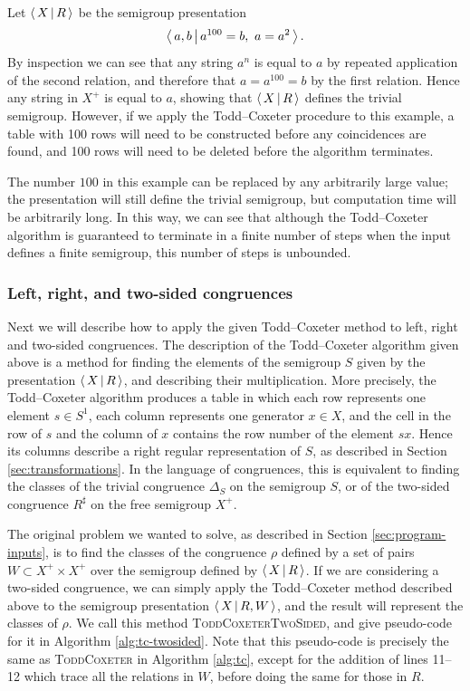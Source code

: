 \begin{example}
  \label{ex:tc-long}
  Let $\left\langle \, X \, \middle| \, R \, \right\rangle$ be the semigroup presentation
  $$\left\langle \, a,b \, \middle| \, a^{100}=b,\ a=a^2 \, \right\rangle.$$
  By inspection we can see that any string $a^n$ is equal to $a$ by repeated
  application of the second relation, and therefore that $a = a^{100} = b$ by
  the first relation.  Hence any string in $X^+$ is equal to $a$, showing that
  $\left\langle \, X \, \middle| \, R \, \right\rangle$ defines the trivial
  semigroup.  However, if we apply the Todd--Coxeter procedure to this example,
  a table with 100 rows will need to be constructed before any coincidences are
  found, and 100 rows will need to be deleted before the algorithm terminates.

  The number $100$ in this example can be replaced by
  any arbitrarily large value; the presentation will still define the
  trivial semigroup, but computation time will be arbitrarily long.
  In this way, we can see that although the Todd--Coxeter algorithm is guaranteed
  to terminate in a finite number of steps when the input defines a finite
  semigroup, this number of steps is unbounded.
\end{example}

\subsubsection{Left, right, and two-sided congruences}
\label{sec:tc-l-r}
Next we will describe how to apply the given Todd--Coxeter method to
left, right and two-sided congruences.  The description of the Todd--Coxeter algorithm given
above is a method for finding the elements of the semigroup $S$ given by the
presentation $\left\langle \, X \, \middle| \, R \, \right\rangle$, and describing their multiplication.  More precisely,
the Todd--Coxeter algorithm produces a table in which each row represents one element
$s \in S^1$, each column represents one generator $x \in X$, and the cell in the
row of $s$ and the column of $x$ contains the row number of the element $sx$.
Hence its columns describe a right regular representation of $S$, as described
in Section \ref{sec:transformations}.  In the language of congruences, this is
equivalent to finding the classes of the trivial congruence $\Delta_S$ on the
semigroup $S$, or of the two-sided congruence $R^\sharp$ on the free semigroup
$X^+$.

The original problem we wanted to solve, as described in Section
\ref{sec:program-inputs}, is to find the classes of the congruence $\rho$
defined by a set of pairs $W \subset X^+ \times X^+$ over the semigroup defined
by $\left\langle \, X \, \middle| \, R \, \right\rangle$.  If we are considering
a two-sided congruence, we can simply apply the Todd--Coxeter method described
above to the semigroup presentation $\left\langle \, X \, \middle| \, R,W \, \right\rangle$, and the result will represent the
classes of $\rho$.  We call this method \textsc{ToddCoxeterTwoSided}, and give
pseudo-code for it in Algorithm \ref{alg:tc-twosided}.  Note that this
pseudo-code is precisely the same as \textsc{ToddCoxeter} in Algorithm
\ref{alg:tc}, except for the addition of lines 11--12 which trace all the
relations in $W$, before doing the same for those in $R$.

